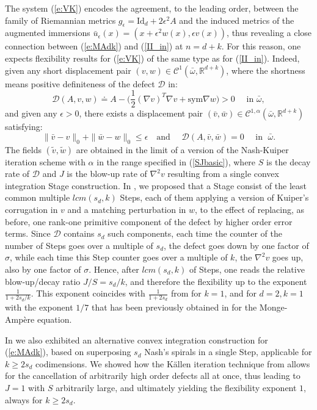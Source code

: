 \documentclass[reqno,twoside,11pt]{amsart}
\newcommand{\sym}{\mathrm{sym}}
\newcommand{\R}{\mathbb{R}}
\numberwithin{equation}{section}
\theoremstyle{plain}
\theoremstyle{definition}
\begin{document}
The system (\ref{e:VK}) encodes the agreement, to the leading order,
between the family of Riemannian metrics $g_\epsilon = \mathrm{Id}_d + 2\epsilon^2
A $ and the induced metrics of the augmented immersions $\bar
u_\epsilon(x) = (x + \epsilon^2 w(x) , \epsilon v(x))$, thus revealing a
close connection between (\ref{e:MAdk}) and (\ref{II_in}) at $n=d+k$. For this reason,
one expects flexibility results for (\ref{e:VK}) of the same type as
for (\ref{II_in}). Indeed, given any short displacement pair
$(v,w)\in\mathcal{C}^1(\bar\omega,\R^{d+k})$, where the shortness 
means positive definiteness of the  defect $\mathcal{D}$ in:
$$\mathcal{D}(A, v,w) \doteq A- \big(\frac{1}{2}(\nabla v)^T\nabla v +
\sym\nabla w\big) > 0 \quad \mbox{ in } \bar \omega,$$ 
and given any $\epsilon>0$, there exists a
displacement pair $(\bar v, \bar
w)\in\mathcal{C}^{1,\alpha}(\bar\omega,\R^{d+k})$ satisfying:
$$\|\bar v - v\|_0 + \|\bar w - w\|_0 \leq \epsilon\quad\mbox{
  and } \quad \mathcal{D}(A, \bar v, \bar w) = 0 \quad\mbox{ in }
\; \bar\omega.$$
The fields $(\tilde v,\tilde w)$ are obtained in the limit of a version
of the Nash-Kuiper iteration scheme with $\alpha$ in the range
specified in (\ref{SJbasic}), where $S$ is the decay rate of
$\mathcal{D}$ and $J$ is the blow-up
rate of $\nabla^2v$ resulting from a single convex integration
Stage construction. In \cite{lew_conv}, we proposed that a Stage consist of
the least common multiple $lcm(s_d, k)$ Steps, each of them applying
a version of Kuiper's corrugation in $v$ and a matching perturbation
in $w$, to the effect of replacing, as before, one rank-one primitive component of
the defect by higher order error terms. Since $\mathcal {D}$
contains $s_d$ such components, each time the counter of the
number of Steps goes over a multiple of $s_d$, the defect goes down
by one factor of $\sigma$, while each time this Step counter goes over a multiple of
$k$, the  $\nabla^2v$ goes up, also by one
factor of $\sigma$. Hence, after $lcm(s_d, k)$ of Steps, one reads the relative blow-up/decay
ratio $J/S = s_d/k$, and therefore the flexibility up to the exponent 
$\frac{1}{1+2s_d/k}$. This exponent coincides with $\frac{1}{1+2s_d}$
from \cite{CDS} for $k=1$, and for $d=2, k=1$  with the exponent
$1/7$ that has been previously obtained in \cite{lewpak_MA} for the
Monge-Amp\`ere equation. 

In \cite{lew_conv} we also exhibited an
alternative convex integration construction for (\ref{e:MAdk}), based
on superposing $s_d$ Nash's spirals in a single Step, applicable for $k\geq 2s_d$ codimensions.
We showed how the K\"allen iteration technique from \cite{Kallen} allows for the
cancellation of arbitrarily high order defects all at once, 
thus leading to $J=1$ with $S$ arbitrarily large, and ultimately yielding the flexibility exponent
$1$, always for $k\geq 2s_d$. 
\end{document}
